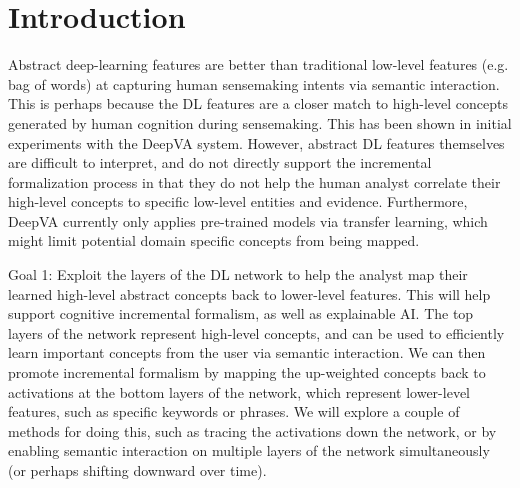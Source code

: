 \documentclass[manuscript,screen]{acmart}
\begin{document}


\maketitle

\section{Introduction}
Abstract deep-learning features are better than traditional low-level features (e.g. bag of words) at capturing human sensemaking intents via semantic interaction.  This is perhaps because the DL features are a closer match to high-level concepts generated by human cognition during sensemaking.  This has been shown in initial experiments with the DeepVA system.  
However, abstract DL features themselves are difficult to interpret, and do not directly support the incremental formalization process in that they do not help the human analyst correlate their high-level concepts to specific low-level entities and evidence. Furthermore, DeepVA currently only applies pre-trained models via transfer learning, which might limit potential domain specific concepts from being mapped.

Goal 1:  Exploit the layers of the DL network to help the analyst map their learned high-level abstract concepts back to lower-level features. This will help support cognitive incremental formalism, as well as explainable AI.  The top layers of the network represent high-level concepts, and can be used to efficiently learn important concepts from the user via semantic interaction.  We can then promote incremental formalism by mapping the up-weighted concepts back to activations at the bottom layers of the network, which represent lower-level features, such as specific keywords or phrases.  We will explore a couple of methods for doing this, such as tracing the activations down the network, or by enabling semantic interaction on multiple layers of the network simultaneously (or perhaps shifting downward over time).
\end{document}
